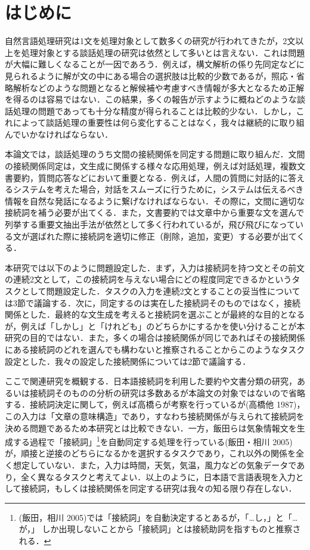 \documentclass[japanese]{jnlp_1.4}
\begin{document}
\maketitle


\section{はじめに}

自然言語処理研究は1文を処理対象として数多くの研究が行われてきたが，2文以上を処理対象とする談話処理の研究は依然として多いとは言えない．これは問題が大幅に難しくなることが一因であろう．例えば，構文解析の係り先同定などに見られるように解が文の中にある場合の選択肢は比較的少数であるが，照応・省略解析などのような問題となると解候補や考慮すべき情報が多大となるため正解を得るのは容易ではない．この結果，多くの報告が示すように概ねどのような談話処理の問題であっても十分な精度が得られることは比較的少ない．しかし，これによって談話処理の重要性は何ら変化することはなく，我々は継続的に取り組んでいかなければならない．

本論文では，談話処理のうち文間の接続関係を同定する問題に取り組んだ．文間の接続関係同定は，文生成に関係する様々な応用処理，例えば対話処理，複数文書要約，質問応答などにおいて重要となる．例えば，人間の質問に対話的に答えるシステムを考えた場合，対話をスムーズに行うために，システムは伝えるべき情報を自然な発話になるように繋げなければならない．その際に，文間に適切な接続詞を補う必要が出てくる．また，文書要約では文章中から重要な文を選んで列挙する重要文抽出手法が依然として多く行われているが，飛び飛びになっている文が選ばれた際に接続詞を適切に修正（削除，追加，変更）する必要が出てくる．

本研究では以下のように問題設定した．まず，入力は接続詞を持つ文とその前文の連続2文として，この接続詞を与えない場合にどの程度同定できるかというタスクとして問題設定した．タスクの入力を連続2文とすることの妥当性については3節で議論する．次に，同定するのは実在した接続詞そのものではなく，接続関係とした．最終的な文生成を考えると接続詞を選ぶことが最終的な目的となるが，例えば「しかし」と「けれども」のどちらかにするかを使い分けることが本研究の目的ではない．また，多くの場合は接続関係が同じであればその接続関係にある接続詞のどれを選んでも構わないと推察されることからこのようなタスク設定とした．我々の設定した接続関係については2節で議論する．

ここで関連研究を概観する．日本語接続詞を利用した要約や文書分類の研究，あるいは接続詞そのものの分析の研究は多数あるが本論文の対象ではないので省略する．接続詞決定に関して，例えば高橋らが考察を行っているが(高橋他 1987)，この入力は「文章の意味構造」であり，すなわち接続関係が与えられて接続詞を決める問題であるため本研究とは比較できない．一方，飯田らは気象情報文を生成する過程で「接続詞」\footnote{
	(飯田，相川 2005)では「接続詞」を自動決定するとあるが，「…し，」と「…が，」
	しか出現しないことから「接続詞」とは接続助詞を指すものと推察される．
}を自動同定する処理を行っている(飯田・相川 2005)が，順接と逆接のどちらになるかを選択するタスクであり，これ以外の関係を全く想定していない．また，入力は時間，天気，気温，風力などの気象データであり，全く異なるタスクと考えてよい．以上のように，日本語で言語表現を入力として接続詞，もしくは接続関係を同定する研究は我々の知る限り存在しない．
\end{document}
